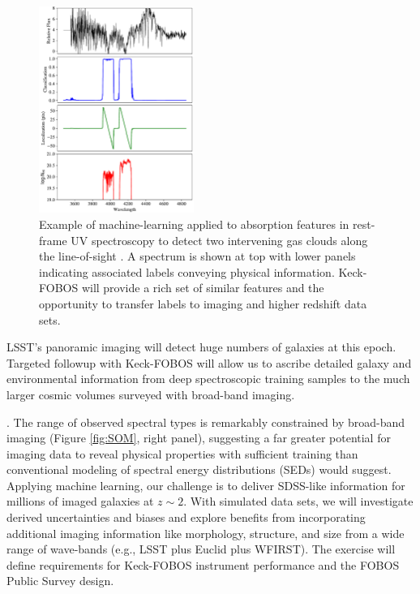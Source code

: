 \documentclass[oneside,11pt]{amsart}
\newcounter{chalno}
\newcommand{\chal}[1]{\refstepcounter{chalno}\label{#1}}
\begin{document}
\begin{figure}\small
%
\includegraphics[width=0.45\textwidth]{Parks18_Fig7_fig_labels.pdf}
%
\caption{Example of machine-learning applied to absorption
features in rest-frame UV spectroscopy to detect two intervening gas
clouds along the line-of-sight \citep[from][]{parks18}.  A spectrum is
shown at top with lower panels indicating associated labels conveying
physical information.  Keck-FOBOS will provide a rich set of similar
features and the opportunity to transfer labels to imaging and higher
redshift data sets.}
%
\label{fig:absorber}
%
\end{figure}

LSST's panoramic imaging will detect huge numbers of galaxies at this
epoch.  Targeted followup with Keck-FOBOS will allow us to ascribe
detailed galaxy and environmental information from deep spectroscopic
training samples to the much larger cosmic volumes surveyed with
broad-band imaging.

\medskip
%
\chal{phot}
%
.  The range
of observed spectral types is remarkably constrained by broad-band
imaging (Figure \ref{fig:SOM}, right panel), suggesting a far greater
potential for imaging data to reveal physical properties with sufficient
training than conventional modeling of spectral energy distributions
(SEDs) would suggest.  Applying machine learning, our challenge is to
deliver SDSS-like information for millions of imaged galaxies at $z \sim
2$.  With simulated data sets, we will investigate derived uncertainties
and biases and explore benefits from incorporating additional imaging
information like morphology, structure, and size from a wide range of
wave-bands (e.g., LSST plus Euclid plus WFIRST).  The exercise will
define requirements for Keck-FOBOS instrument performance and the FOBOS
Public Survey design.
\end{document}
